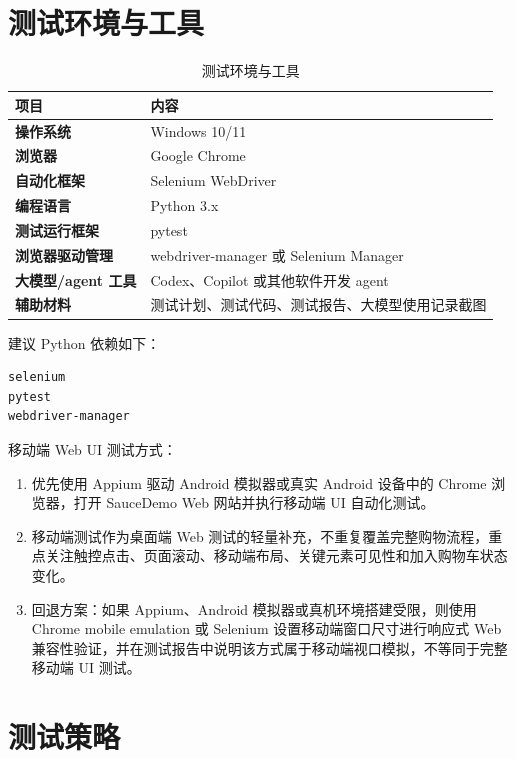 \documentclass[UTF8,a4paper,12pt]{ctexart}
\begin{document}
\section{测试环境与工具}

\begin{table}[htbp]
\centering
\caption{测试环境与工具}
\begin{tabularx}{\textwidth}{>{\bfseries}p{3.2cm}X}
\toprule
项目 & 内容 \\
\midrule
操作系统 & Windows 10/11 \\
浏览器 & Google Chrome \\
自动化框架 & Selenium WebDriver \\
编程语言 & Python 3.x \\
测试运行框架 & pytest \\
浏览器驱动管理 & webdriver-manager 或 Selenium Manager \\
大模型/agent 工具 & Codex、Copilot 或其他软件开发 agent \\
辅助材料 & 测试计划、测试代码、测试报告、大模型使用记录截图 \\
\bottomrule
\end{tabularx}
\end{table}

建议 Python 依赖如下：

\begin{lstlisting}
selenium
pytest
webdriver-manager
\end{lstlisting}

移动端 Web UI 测试方式：

\begin{enumerate}
  \item 优先使用 Appium 驱动 Android 模拟器或真实 Android 设备中的 Chrome 浏览器，打开 SauceDemo Web 网站并执行移动端 UI 自动化测试。
  \item 移动端测试作为桌面端 Web 测试的轻量补充，不重复覆盖完整购物流程，重点关注触控点击、页面滚动、移动端布局、关键元素可见性和加入购物车状态变化。
  \item 回退方案：如果 Appium、Android 模拟器或真机环境搭建受限，则使用 Chrome mobile emulation 或 Selenium 设置移动端窗口尺寸进行响应式 Web 兼容性验证，并在测试报告中说明该方式属于移动端视口模拟，不等同于完整移动端 UI 测试。
\end{enumerate}

\section{测试策略}
\end{document}
